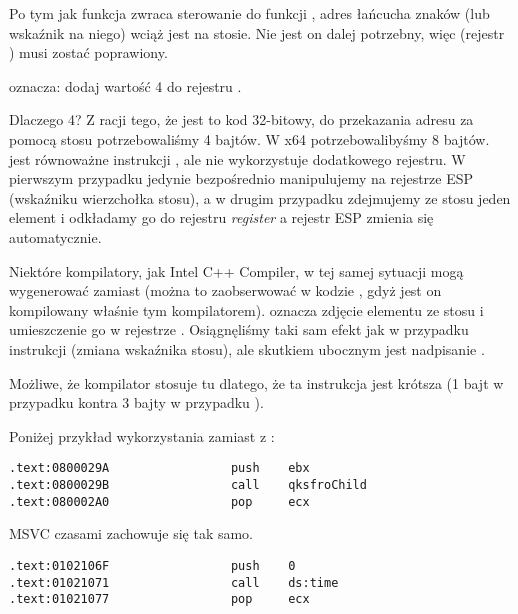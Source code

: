 Po tym jak funkcja \printf zwraca sterowanie do funkcji \main, adres łańcucha znaków (lub wskaźnik na niego) wciąż jest na stosie.
Nie jest on dalej potrzebny, więc  (rejestr \ESP) musi zostać poprawiony.

 oznacza: dodaj wartość 4 do rejestru \ESP.

Dlaczego 4? Z racji tego, że jest to kod 32-bitowy, do przekazania adresu za pomocą stosu potrzebowaliśmy 4 bajtów. W x64 potrzebowalibyśmy 8 bajtów.\\
 jest równoważne instrukcji , ale nie wykorzystuje dodatkowego rejestru. W pierwszym przypadku jedynie bezpośrednio manipulujemy na rejestrze ESP (wskaźniku wierzchołka stosu), a w drugim przypadku zdejmujemy ze stosu jeden element i odkładamy go do rejestru \emph{register} a rejestr ESP zmienia się automatycznie.

\myindex{\oracle}

Niektóre kompilatory, jak Intel C++ Compiler, w tej samej sytuacji mogą wygenerować  zamiast \ADD (można to zaobserwować w kodzie \oracle{}, gdyż jest on kompilowany właśnie tym kompilatorem).
 oznacza zdjęcie elementu ze stosu i umieszczenie go w rejestrze \ECX.
Osiągnęliśmy taki sam efekt jak w przypadku instrukcji \ADD (zmiana wskaźnika stosu), ale skutkiem ubocznym jest nadpisanie \ECX.

Możliwe, że kompilator stosuje tu  dlatego, że ta instrukcja jest krótsza (1 bajt w przypadku  kontra 3 bajty w przypadku ).

Poniżej przykład wykorzystania \POP zamiast \ADD z \oracle{}:

\begin{lstlisting}[caption=\oracle 10.2 Linux (plik app.o),style=customasmx86]
.text:0800029A                 push    ebx
.text:0800029B                 call    qksfroChild
.text:080002A0                 pop     ecx
\end{lstlisting}

MSVC czasami zachowuje się tak samo.

\begin{lstlisting}[caption=Saper na systemie Windows 7 32-bit]
.text:0102106F                 push    0
.text:01021071                 call    ds:time
.text:01021077                 pop     ecx
\end{lstlisting}

